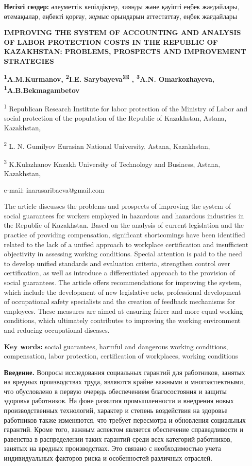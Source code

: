 {\bfseries Негізгі сөздер:} әлеуметтік кепілдіктер, зиянды және қауіпті
еңбек жағдайлары, өтемақылар, еңбекті қорғау, жұмыс орындарын
аттестаттау, еңбек жағдайлары

{\bfseries IMPROVING THE SYSTEM OF ACCOUNTING AND ANALYSIS OF LABOR
PROTECTION COSTS IN THE REPUBLIC OF KAZAKHSTAN: PROBLEMS, PROSPECTS AND
IMPROVEMENT STRATEGIES}

{\bfseries \textsuperscript{1}A.M.Kurmanov, \textsuperscript{2}I.E.
Sarybayeva\textsuperscript{🖂} , \textsuperscript{3}A.N. Omarkozhayeva,
\textsuperscript{1}A.B.Bekmagambetov}

\textsuperscript{1} Republican Research Institute for labor protection
of the Ministry of Labor and social protection of the population of the
Republic of Kazakhstan, Astana, Kazakhstan,

\textsuperscript{2} L. N. Gumilyov Eurasian National University, Astana,
Kazakhstan,

\textsuperscript{3} K.Kulazhanov Kazakh University of Technology and
Business, Astana, Kazakhstan,

e-mail: inarasaribaeva@gmail.com

The article discusses the problems and prospects of improving the system
of social guarantees for workers employed in hazardous and hazardous
industries in the Republic of Kazakhstan. Based on the analysis of
current legislation and the practice of providing compensation,
significant shortcomings have been identified related to the lack of a
unified approach to workplace certification and insufficient objectivity
in assessing working conditions. Special attention is paid to the need
to develop unified standards and evaluation criteria, strengthen control
over certification, as well as introduce a differentiated approach to
the provision of social guarantees. The article offers recommendations
for improving the system, which include the development of new
legislative acts, professional development of occupational safety
specialists and the creation of feedback mechanisms for employees. These
measures are aimed at ensuring fairer and more equal working conditions,
which ultimately contributes to improving the working environment and
reducing occupational diseases.

{\bfseries Key words:} social guarantees, harmful and dangerous working
conditions, compensation, labor protection, certification of workplaces,
working conditions

{\bfseries Введение.} Вопросы исследования социальных гарантий для
работников, занятых на вредных производствах труда, являются крайне
важными и многоаспектными, что обусловлено в первую очередь обеспечением
благосостояния и защиты здоровья работников. На фоне развития
промышленности и внедрения новых производственных технологий, характер и
степень воздействия на здоровье работников также изменяются, что требует
пересмотра и обновления социальных гарантий. Кроме того, важным аспектом
является обеспечение справедливости и равенства в распределении таких
гарантий среди всех категорий работников, занятых на вредных
производствах. Это связано с необходимостью учета индивидуальных
факторов риска и особенностей различных отраслей.

